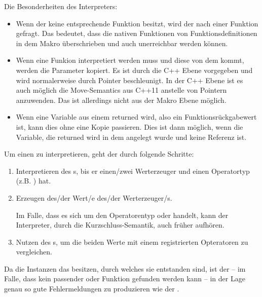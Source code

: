      Die Besonderheiten des Interpreters:
      \begin{itemize}
        \item Wenn der  keine entsprechende Funktion besitzt, wird der  nach einer Funktion gefragt. Das bedeutet, dass die nativen Funktionen von Funktionsdefinitionen in dem Makro überschrieben und auch unerreichbar werden können.
        \item Wenn eine Funkion interpretiert werden muss und diese von dem  kommt, werden die Parameter kopiert. Es ist durch die C++ Ebene vorgegeben und wird normalerweise durch Pointer beschleunigt. In der C++ Ebene ist es auch möglich die Move-Semantics\autocite[S.268 ff.]{C++14-std} aus C++11 anstelle von Pointern anzuwenden. Das ist allerdings nicht aus der Makro Ebene möglich.
        \item Wenn eine Variable aus einem  returned wird, also ein Funktionsrückgabewert ist, kann dies ohne eine Kopie passieren. Dies ist dann möglich, wenn die Variable, die returned wird in dem  angelegt wurde und keine Referenz ist.
      \end{itemize}

      Um einen  zu interpretieren, geht der  durch folgende Schritte:
      \begin{enumerate}
        \item Interpretieren des s, bis er einen/zwei Werterzeuger und einen Operatortyp (z.B. \myMinin{==}) hat.
        \item Erzeugen des/der Wert/e des/der Werterzeuger/s.

          Im Falle, dass es sich um den Operatorentyp \myMinin{&&} oder \myMinin{||} handelt, kann der Interpreter, durch die Kurzschluss-Semantik, auch früher aufhören.
        \item Nutzen des s, um die beiden Werte mit einem registrierten Opteratoren zu vergleichen.
      \end{enumerate}

      Da die  Instanzen das  besitzen, durch welches sie entstanden sind, ist der  -- im Falle, dass kein passender  oder Funktion gefunden werden kann -- in der Lage genau so gute Fehlermeldungen zu produzieren wie der .

